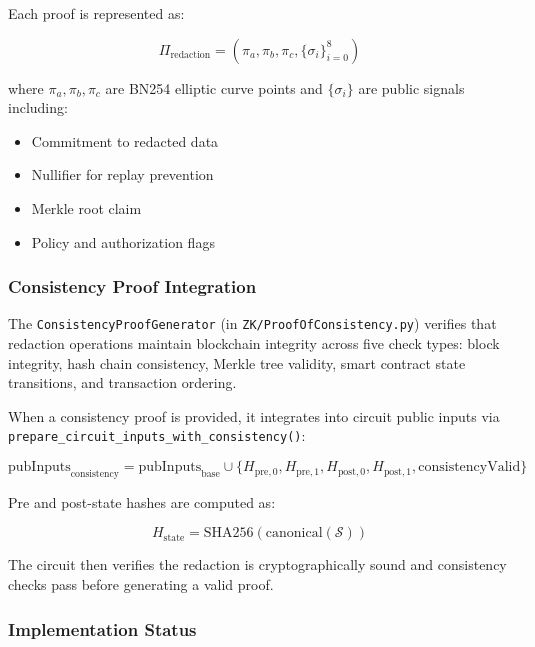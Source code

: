 Each proof is represented as:

\begin{equation}
    \Pi_{\text{redaction}} = (\pi_a, \pi_b, \pi_c, \{\sigma_i\}_{i=0}^{8})
\end{equation}

where $\pi_a, \pi_b, \pi_c$ are BN254 elliptic curve points and $\{\sigma_i\}$ are public signals including:
\begin{itemize}
    \item Commitment to redacted data
    \item Nullifier for replay prevention
    \item Merkle root claim
    \item Policy and authorization flags
\end{itemize}

\subsubsection{Consistency Proof Integration}

The \texttt{ConsistencyProofGenerator} (in \texttt{ZK/ProofOfConsistency.py}) verifies that redaction operations maintain blockchain integrity across five check types: block integrity, hash chain consistency, Merkle tree validity, smart contract state transitions, and transaction ordering.

When a consistency proof is provided, it integrates into circuit public inputs via \texttt{prepare\_circuit\_inputs\_with\_consistency()}:

\begin{equation}
    \text{pubInputs}_{\text{consistency}} = \text{pubInputs}_{\text{base}} \cup \{
        H_{\text{pre},0}, H_{\text{pre},1},
        H_{\text{post},0}, H_{\text{post},1},
        \text{consistencyValid}
    \}
\end{equation}

Pre and post-state hashes are computed as:

\begin{equation}
    H_{\text{state}} = \text{SHA256}(\text{canonical}(\mathcal{S}))
\end{equation}

The circuit then verifies the redaction is cryptographically sound and consistency checks pass before generating a valid proof.

\subsubsection{Implementation Status}

